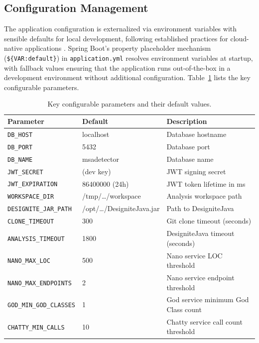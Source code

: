 \subsection{Configuration Management}
\label{subsec:config-management}

 \par The application configuration is externalized via environment variables with sensible defaults for local development, following established practices for cloud-native applications \cite{Newman2015}. Spring Boot's property placeholder mechanism (\texttt{\$\{VAR:default\}}) in \texttt{application.yml} resolves environment variables at startup, with fallback values ensuring that the application runs out-of-the-box in a development environment without additional configuration. Table~\ref{tab:config-params} lists the key configurable parameters.

\begin{table}[htbp]
    \centering
    \footnotesize
    \begin{tabular}{|l|l|p{4.5cm}|}
        \hline
        \textbf{Parameter} & \textbf{Default} & \textbf{Description} \\
        \hline\hline
        \texttt{DB\_HOST} & localhost & Database hostname \\
        \hline
        \texttt{DB\_PORT} & 5432 & Database port \\
        \hline
        \texttt{DB\_NAME} & msadetector & Database name \\
        \hline
        \texttt{JWT\_SECRET} & (dev key) & JWT signing secret \\
        \hline
        \texttt{JWT\_EXPIRATION} & 86400000 (24h) & JWT token lifetime in ms \\
        \hline
        \texttt{WORKSPACE\_DIR} & /tmp/\ldots/workspace & Analysis workspace path \\
        \hline
        \texttt{DESIGNITE\_JAR\_PATH} & /opt/\ldots/DesigniteJava.jar & Path to DesigniteJava \\
        \hline
        \texttt{CLONE\_TIMEOUT} & 300 & Git clone timeout (seconds) \\
        \hline
        \texttt{ANALYSIS\_TIMEOUT} & 1800 & DesigniteJava timeout (seconds) \\
        \hline
        \texttt{NANO\_MAX\_LOC} & 500 & Nano service LOC threshold \\
        \hline
        \texttt{NANO\_MAX\_ENDPOINTS} & 2 & Nano service endpoint threshold \\
        \hline
        \texttt{GOD\_MIN\_GOD\_CLASSES} & 1 & God service minimum God Class count \\
        \hline
        \texttt{CHATTY\_MIN\_CALLS} & 10 & Chatty service call count threshold \\
        \hline
    \end{tabular}
    \caption{Key configurable parameters and their default values.}
    \label{tab:config-params}
\end{table}

